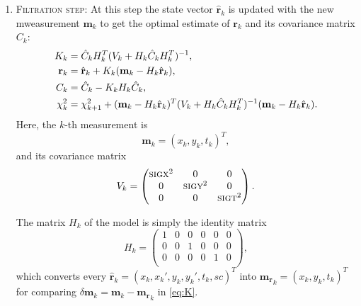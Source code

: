 \documentclass[a4paper]{book}
\let\vec\mathbf  %
\begin{document}
\begin{enumerate}
	\item \textsc{Filtration step:} At this step the state vector $\hat{\vec{r}}_k$ is updated with the new mweasurement $\vec{m}_k$ to get the optimal estimate of $\vec{r}_k$ and its covariance matrix $C_k$:
	\begin{align}
	\notag
	K_k &= \hat{C}_k H_k^T (V_k + H_k \hat{C}_k H_k^T )^{-1},\\ \notag
	\vec{r}_k &= \hat{\vec{r}}_k + K_k (\vec{m}_k - H_k \hat{\vec{r}}_k),\\ \notag
	C_k &= \hat{C}_k - K_k H_k \hat{C}_k,\\
	\chi^2_k &= \chi^2_{k+1} + (\vec{m}_k - H_k \hat{\vec{r}}_k )^T (V_k + H_k \hat{C}_k H_k^T )^{-1} (\vec{m}_k - H_k \hat{\vec{r}}_k ).
	\label{eq:K}
	\end{align}
	Here, the $k$-th measurement is
	\begin{equation}
	\vec{m}_k = (x_k, y_k, t_k)^T,
	\label{eq:m}
	\end{equation}
	and its covariance matrix
	\begin{equation}
	V_k = \left(
	\begin{matrix}
	\mathrm{\textsc{sigx}}^2 & 0                        & 0                      \\
	0                        & \mathrm{\textsc{sigy}}^2 & 0                       \\
	0                        & 0                        & \mathrm{\textsc{sigt}}^2 \\
	\end{matrix} \right).
	\label{eq:V}
	\end{equation}
	
	The matrix $H_k$ of the model is simply the identity matrix
	\begin{equation}
	H_k = 
	\left(
	\begin{matrix}
	1 & 0 & 0 & 0 & 0 & 0    \\
	0 & 0 & 1 & 0 & 0 & 0     \\
	0 & 0 & 0 & 0 & 1 & 0      \\
	\end{matrix}\right),
	\label{eq:h}
	\end{equation}
	which converts every $\hat{\vec{r}}_k = (x_k, x_k', y_k, y_k', t_k, sc)^T$ into $\vec{m_r}_k = (x_k, y_k, t_k)^T$ for comparing $\delta \vec{m}_k = \vec{m}_k - \vec{m_r}_k$ in \eqref{eq:K}.
	
\end{enumerate}
\end{document}
